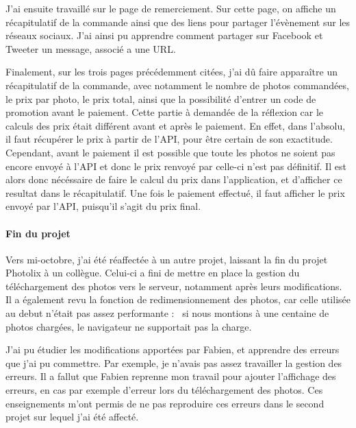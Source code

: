 \documentclass[12pt,a4paper]{article}
\begin{document}
  \bigskip

  J'ai ensuite travaillé sur le page de remerciement. Sur cette page, on
  affiche un récapitulatif de la commande ainsi que des liens pour
  partager l'évènement sur les réseaux sociaux. J'ai ainsi pu apprendre
  comment partager sur Facebook et Tweeter un message, associé a une URL.

  \bigskip

  Finalement, sur les trois pages précédemment citées, j'ai dû faire
  apparaître un récapitulatif de la commande, avec notamment le nombre de
  photos commandées, le prix par photo, le prix total, ainsi que la
  possibilité d'entrer un code de promotion avant le paiement. Cette
  partie à demandée de la réflexion car le calculs des prix était
  différent avant et après le paiement. En effet, dans l'absolu, il faut
  récupérer le prix à partir de l'API, pour être certain de son
  exactitude. Cependant, avant le paiement il est possible que toute les
  photos ne soient pas encore envoyé à l'API et donc le prix renvoyé par
  celle-ci n'est pas définitif. Il est alors donc nécéssaire de faire le
  calcul du prix dans l'application, et d'afficher ce resultat dans le
  récapitulatif. Une fois le paiement effectué, il faut afficher le prix
  envoyé par l'API, puisqu'il s'agit du prix final.

  \bigskip

  \paragraph{Fin du projet}\label{fin-du-projet}

  \bigskip

  Vers mi-octobre, j'ai été réaffectée à un autre projet, laissant la fin
  du projet Photolix à un collègue. Celui-ci a fini de mettre en place la
  gestion du téléchargement des photos vers le serveur, notamment après
  leurs modifications. Il a également revu la fonction de
  redimensionnement des photos, car celle utilisée au debut n'était pas
  assez performante : ~si nous montions à une centaine de photos chargées,
  le navigateur ne supportait pas la charge.

  \bigskip

  J'ai pu étudier les modifications apportées par Fabien, et apprendre des
  erreurs que j'ai pu commettre. Par exemple, je n'avais pas assez
  travailler la gestion des erreurs. Il a fallut que Fabien reprenne mon
  travail pour ajouter l'affichage des erreurs, en cas par exemple
  d'erreur lors du téléchargement des photos. Ces enseignements m'ont
  permis de ne pas reproduire ces erreurs dans le second projet sur lequel
  j'ai été affecté.
\end{document}
